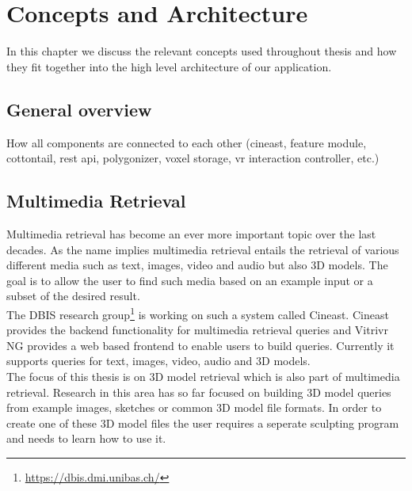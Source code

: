 \chapter{Concepts and Architecture}

In this chapter we discuss the relevant concepts used throughout thesis and how they fit together into the high level architecture of our
application.

\section{General overview}
How all components are connected to each other (cineast, feature module, cottontail, rest api, polygonizer, voxel storage, vr interaction controller, etc.)




\section{Multimedia Retrieval}

Multimedia retrieval has become an ever more important topic over the last decades. As the name implies multimedia retrieval entails the retrieval of various different media such as text, images, video and audio but also
3D models. The goal is to allow the user to find such media based on an example input or a subset of the desired result.\\
The DBIS research group\footnote{\url{https://dbis.dmi.unibas.ch/}} is working on such a system called Cineast. Cineast provides the backend functionality for multimedia retrieval queries and Vitrivr NG provides a web
based frontend to enable users to build queries. Currently it supports queries for text, images, video, audio and 3D models.\\
The focus of this thesis is on 3D model retrieval which is also part of multimedia retrieval. Research in this area has so far focused on building 3D model queries from example images, sketches or common 3D model file formats.
In order to create one of these 3D model files the user requires a seperate sculpting program and needs to learn how to use it.


